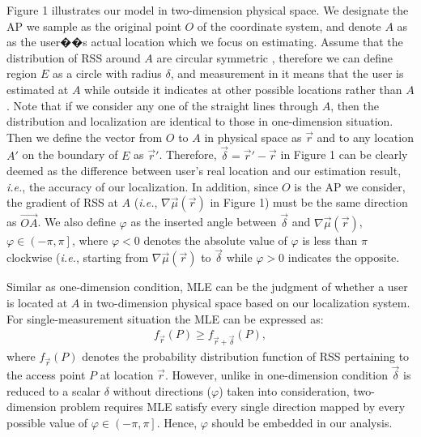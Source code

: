 \documentclass[10pt,conference,compsocconf,letterpaper]{IEEEtran}
\newcommand{\ie}{{\em i.e.}}
\begin{document}
Figure 1 illustrates our model in two-dimension physical space. We designate the AP we sample as the original point $O$ of the coordinate system, and denote $A$ as as the user��s actual location which we focus on estimating. Assume that the distribution of RSS around $A$ are circular symmetric , therefore we can define region $E$ as a circle with radius $\delta$, and measurement in it means that the user is estimated at $A$ while outside it indicates at other possible locations rather than $A$. Note that if we consider any one of the straight lines through $A$, then the distribution and localization are identical to those in one-dimension situation. Then we define the vector from $O$ to $A$ in physical space as $\vec r$ and to any location $A'$ on the boundary of $E$ as $\vec r'$. Therefore, $\vec \delta  = \vec r' - \vec r$ in Figure 1 can be clearly deemed as the difference between user's real location and our estimation result, \ie, the accuracy of our localization. In addition, since $O$ is the AP we consider, the gradient of RSS at $A$ (\ie, $\nabla \vec \mu (\vec r)$ in Figure 1) must be the same direction as $\overrightarrow{OA}$. We also define $\varphi$ as the inserted angle between $\vec \delta $ and $\nabla \vec \mu (\vec r)$, $\varphi  \in \left( { - \pi ,\pi } \right]$, where $\varphi < 0$ denotes the absolute value of $\varphi$ is less than $\pi$ clockwise (\ie, starting from $\nabla \vec \mu (\vec r)$ to $\vec \delta $ while $\varphi  > 0$ indicates the opposite.

Similar as one-dimension condition, MLE can be the judgment of whether a user is located at $A$ in two-dimension physical space based on our localization system. For single-measurement situation the MLE can be expressed as:
\begin{align}
{f_{\vec r}}(P) \ge {f_{\vec r + \vec \delta }}(P),
\end{align}
where ${f_{\vec r}}(P)$ denotes the probability distribution function of RSS pertaining to the access point $P$ at location $\vec r$. However, unlike in one-dimension condition $\vec \delta$ is reduced to a scalar $\delta$ without directions ($\varphi$) taken into consideration, two-dimension problem requires MLE satisfy every single direction mapped by every possible value of $\varphi  \in \left( { - \pi ,\pi } \right]$. Hence, $\varphi$ should be embedded in our analysis.
\end{document}

